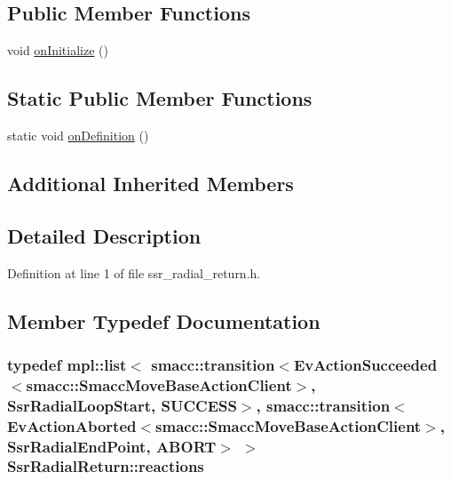 \subsection*{Public Member Functions}
\begin{DoxyCompactItemize}
\item 
void \hyperlink{structSsrRadialReturn_a713e3a0722102ad2c4b030aeceefe823}{on\+Initialize} ()
\end{DoxyCompactItemize}
\subsection*{Static Public Member Functions}
\begin{DoxyCompactItemize}
\item 
static void \hyperlink{structSsrRadialReturn_a3baaac05dff1106adbacbf57edf0f162}{on\+Definition} ()
\end{DoxyCompactItemize}
\subsection*{Additional Inherited Members}


\subsection{Detailed Description}


Definition at line 1 of file ssr\+\_\+radial\+\_\+return.\+h.



\subsection{Member Typedef Documentation}
\subsubsection[{\texorpdfstring{reactions}{reactions}}]{\setlength{\rightskip}{0pt plus 5cm}typedef mpl\+::list$<$ {\bf smacc\+::transition}$<$Ev\+Action\+Succeeded$<${\bf smacc\+::\+Smacc\+Move\+Base\+Action\+Client}$>$, {\bf Ssr\+Radial\+Loop\+Start}, {\bf S\+U\+C\+C\+E\+SS}$>$, {\bf smacc\+::transition}$<$Ev\+Action\+Aborted$<${\bf smacc\+::\+Smacc\+Move\+Base\+Action\+Client}$>$, {\bf Ssr\+Radial\+End\+Point}, {\bf A\+B\+O\+RT}$>$ $>$ {\bf Ssr\+Radial\+Return\+::reactions}}\hypertarget{structSsrRadialReturn_ae9ba2d9194983c0effd1ff54cecdc23e}{}\label{structSsrRadialReturn_ae9ba2d9194983c0effd1ff54cecdc23e}


